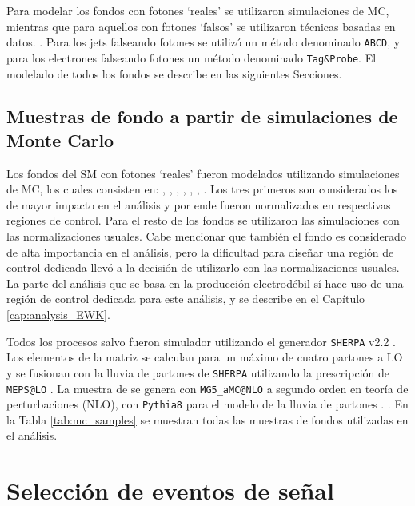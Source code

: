 Para modelar los fondos con fotones `reales' se utilizaron simulaciones de MC, mientras que para aquellos con fotones `falsos' se utilizaron técnicas basadas en datos. . Para los jets falseando fotones se utilizó un método denominado \texttt{ABCD}, y para los electrones falseando fotones un método denominado \texttt{Tag\&Probe}. El modelado de todos los fondos se describe en las siguientes Secciones.

\subsection{Muestras de fondo a partir de simulaciones de Monte Carlo}

Los fondos del SM con fotones `reales' fueron modelados utilizando simulaciones de MC, los cuales consisten en: \phj, \wph, \ttbarph, \wphph, \zph, \zphph, \phph. Los tres primeros son considerados los de mayor impacto en el análisis y por ende fueron normalizados en respectivas regiones de control. Para el resto de los fondos se utilizaron las simulaciones con las normalizaciones usuales. 
Cabe mencionar que también el fondo \znunuph es considerado de alta importancia en el análisis, pero la dificultad para diseñar una región de control dedicada llevó a la decisión de utilizarlo con las normalizaciones usuales. La parte del análisis que se basa en la producción electrodébil  sí hace uso de una región de control dedicada para este análisis, y se describe en el Capítulo \ref{cap:analysis_EWK}.

Todos los procesos salvo \ttbarph fueron simulador utilizando el generador \texttt{SHERPA} v2.2 \cite{Bothmann:2019yzt}. Los elementos de la matriz se calculan para un máximo de cuatro partones
a LO y se fusionan con la lluvia de partones de \texttt{SHERPA} \cite{Schumann:2007mg} utilizando la prescripción de \texttt{MEPS@LO} \cite{Hoeche:2012yf}. La muestra de \ttbarph se genera con \texttt{MG5\_aMC@NLO} \cite{Alwall:2014hca} a segundo orden en teoría de perturbaciones (NLO), con \texttt{Pythia8} para el modelo de la lluvia de partones \cite{Sjostrand:2014zea}. . En la Tabla \ref{tab:mc_samples} se muestran todas las muestras de fondos utilizadas en el análisis. 



\section{Selección de eventos de señal}

